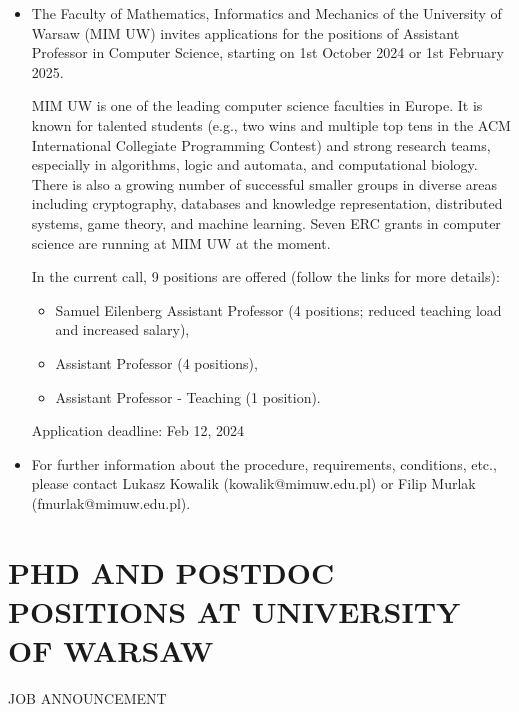 \documentclass[prodmode,acmtecs]{acmsmall} %
\begin{document}
\begin{itemize}\item  The Faculty of Mathematics, Informatics and Mechanics of the University of Warsaw (MIM UW) invites applications for the positions of Assistant Professor in Computer Science, starting on 1st October 2024 or 1st February 2025. 
 
  MIM UW is one of the leading computer science faculties in Europe. It is known for talented students (e.g., two wins and multiple top tens in the ACM International Collegiate Programming Contest) and strong research teams, especially in algorithms, logic and automata, and computational biology. There is also a growing number of successful smaller groups in diverse areas including cryptography, databases and knowledge representation, distributed systems, game theory, and machine learning. Seven ERC grants in computer science are running at MIM UW at the moment. 
 
  In the current call, 9 positions are offered (follow the links for more details): 
 
\begin{itemize}\item  Samuel Eilenberg Assistant Professor (4 positions; reduced teaching load and increased salary),
\item  Assistant Professor (4 positions),
\item  Assistant Professor - Teaching (1 position).
\end{itemize} 
Application deadline: Feb 12, 2024 
 
\item  For further information about the procedure, requirements, conditions, etc., please contact Lukasz Kowalik (kowalik@mimuw.edu.pl) or Filip Murlak (fmurlak@mimuw.edu.pl). 
 
\end{itemize}\section{PHD AND POSTDOC POSITIONS AT UNIVERSITY OF WARSAW}\label{PHDANDPOSTDOCPOSITIONSATUNIVERSITYOFWARSAW}JOB ANNOUNCEMENT 
\end{document}
